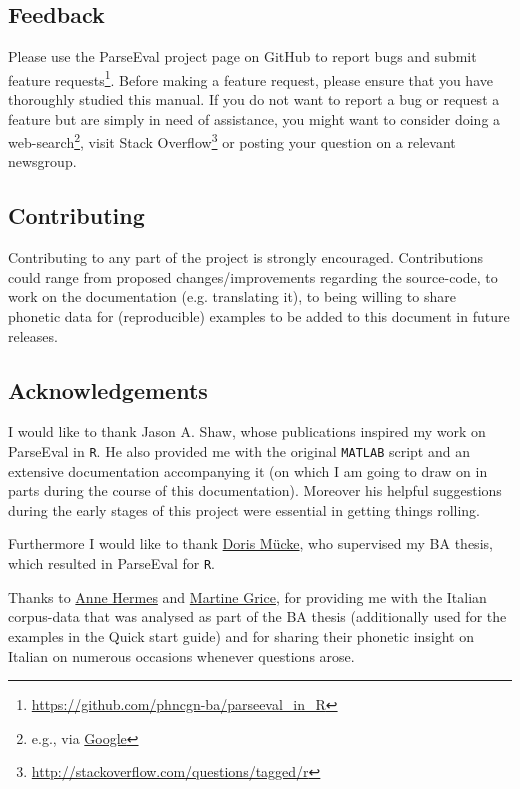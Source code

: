 \documentclass[
draft=false,
toc=graduated,
listof=totoc,
headsepline=true,
]%
{scrartcl}
\begin{document}
\subsection{Feedback}
Please use the ParseEval project page on GitHub to report bugs and submit feature requests\footnote{\url{https://github.com/phncgn-ba/parseeval\_in\_R}}. Before making a feature request, please ensure that you have thoroughly studied this manual. If you do not want to report a bug or request a feature but are simply in need of assistance, you might want to consider doing a web-search\footnote{e.g., via \href{https:\\www.google.com}{Google}}, visit Stack Overflow\footnote{\url{http://stackoverflow.com/questions/tagged/r}} or posting your question on a relevant newsgroup.
\subsection{Contributing}
Contributing to any part of the project is strongly encouraged. Contributions could range from proposed changes/improvements regarding the source-code, to work on the documentation (e.g. translating it), to being willing to share phonetic data for (reproducible) examples to be added to this document in future releases.
\subsection{Acknowledgements}
I would like to thank Jason A. Shaw, whose publications \parencite{Shaw2009,Shaw2011} inspired my work on ParseEval in \texttt{R}. He also provided me with the original \texttt{MATLAB} script and an extensive documentation accompanying it (on which I am going to draw on in parts during the course of this documentation). Moreover his helpful suggestions during the early stages of this project were essential in getting things rolling.\par
Furthermore I would like to thank \href{http://phonetik.phil-fak.uni-koeln.de/21.html}{Doris Mücke}, who supervised my BA thesis, which resulted in ParseEval for \texttt{R}.\par
Thanks to \href{http://phonetik.phil-fak.uni-koeln.de/143.html}{Anne Hermes} and \href{http://phonetik.phil-fak.uni-koeln.de/130.html}{Martine Grice}, for providing me with the Italian corpus-data that was analysed as part of the BA thesis (additionally used for the examples in the Quick start guide) and for sharing their phonetic insight on Italian on numerous occasions whenever questions arose.\par
\end{document}
